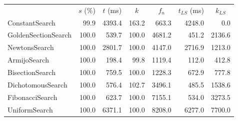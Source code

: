 \documentclass[a4paper,english,titlepage,12pt]{article}
\begin{document}
\begin{center}
\label{tab:performance_results_NegativeEntropy}
\begin{tabular}{|l|r|r|r|r|r|r|}
\hline
\rowcolor{gray!25}
\multicolumn{1}{|c|}{Line Search Name} & \multicolumn{1}{c|}{$s$ (\%)} & \multicolumn{1}{c|}{$t$ (ms)} & \multicolumn{1}{c|}{$k$} & \multicolumn{1}{c|}{$f_n$} & \multicolumn{1}{c|}{$t_{LS}$ (ms)} & \multicolumn{1}{c|}{$k_{LS}$} \\
ConstantSearch & 99.9 & 4393.4 & 163.2 & 663.3 & 4248.0 & 0.0 \\
GoldenSectionSearch & 100.0 & 539.7 & 100.0 & 4681.2 & 451.2 & 2136.6 \\
NewtonsSearch & 100.0 & 2801.7 & 100.0 & 4147.0 & 2716.9 & 1213.0 \\
ArmijoSearch & 100.0 & 198.4 & 99.8 & 1119.4 & 112.0 & 412.8 \\
BisectionSearch & 100.0 & 759.5 & 100.0 & 1228.3 & 672.9 & 777.8 \\
DichotomousSearch & 100.0 & 576.4 & 102.7 & 3496.1 & 485.5 & 1538.6 \\
FibonacciSearch & 100.0 & 623.7 & 100.0 & 7155.1 & 534.0 & 3273.5 \\
UniformSearch & 100.0 & 6371.1 & 100.0 & 8208.0 & 6277.0 & 7700.0 \\

\hline
\end{tabular}
\end{center}
\end{document}
